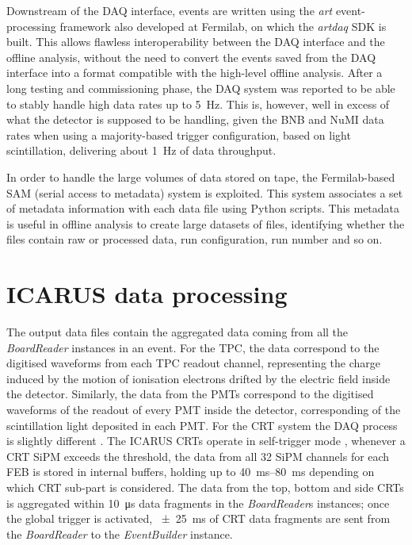 Downstream of the DAQ interface, events are written using the \emph{art} event-processing framework \cite{greenArtFramework2012} also developed at Fermilab, on which the \emph{artdaq} SDK is built. This allows flawless interoperability between the DAQ interface and the offline analysis, without the need to convert the events saved from the DAQ interface into a format compatible with the high-level offline analysis. After a long testing and commissioning phase, the DAQ system was reported to be able to stably handle high data rates up to \SI{5}{\hertz}. This is, however, well in excess of what the detector is supposed to be handling, given the BNB and NuMI data rates when using a majority-based trigger configuration, based on light scintillation, delivering about \SI{1}{\hertz} of data throughput.  

In order to handle the large volumes of data stored on tape, the Fermilab-based SAM (serial access to metadata) system is exploited. This system associates a set of metadata information with each data file using Python scripts. This metadata is useful in offline analysis to create large datasets of files, identifying whether the files contain raw or processed data, run configuration, run number and so on.

\section{ICARUS data processing}

The output data files contain the aggregated data coming from all the \emph{BoardReader} instances in an event. For the TPC, the data correspond to the digitised waveforms from each TPC readout channel, representing the charge induced by the motion of ionisation electrons drifted by the electric field inside the detector. Similarly, the data from the PMTs correspond to the digitised waveforms of the readout of every PMT inside the detector, corresponding of the scintillation light deposited in each PMT. For the CRT system the DAQ process is slightly different \cite{ICARUS:2025rdw,Poppi:2023zmp,Poppi:2022vhg}. The ICARUS CRTs operate in self-trigger mode \cite{arteroponsStudyReconstructionNuMuCC, ICARUS:2025rdw}, whenever a CRT SiPM exceeds the threshold, the data from all 32 SiPM channels for each FEB is stored in internal buffers, holding up to \qtyrange{40}{80}{\ms} depending on which CRT sub-part is considered. The data from the top, bottom and side CRTs is aggregated within \SI{10}{\us} data fragments in the \emph{BoardReader}s instances; once the global trigger is activated, \SI{+-25}{\ms} of CRT data fragments are sent from the \emph{BoardReader} to the \emph{EventBuilder} instance. 

